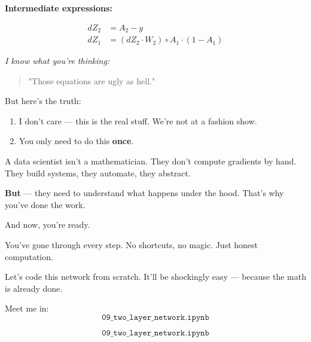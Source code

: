 \documentclass[11pt]{article}
\begin{document}
\vspace{1em}

\textbf{Intermediate expressions:}

\[
\boxed{
\begin{aligned}
dZ_2 &= A_2 - y \\
dZ_1 &= (dZ_2 \cdot W_2) \circ A_1 \cdot (1 - A_1)
\end{aligned}
}
\]

\vspace{2em}

\textit{I know what you're thinking:}

\begin{quote}
"Those equations are ugly as hell."
\end{quote}

But here’s the truth:

\begin{enumerate}
  \item I don't care — this is the real stuff. We’re not at a fashion show.
  \item You only need to do this \textbf{once}.
\end{enumerate}

\vspace{1em}

A data scientist isn’t a mathematician.  
They don’t compute gradients by hand.  
They build systems, they automate, they abstract.

\textbf{But} — they need to understand what happens under the hood.  
That’s why you’ve done the work.

\vspace{1em}

And now, you’re ready.

You’ve gone through every step. No shortcuts, no magic. Just honest computation.

\vspace{1em}

\begin{tcolorbox}[colback=blue!5!white, colframe=blue!80!black, title=Next Stop — Practice]
Let’s code this network from scratch.  
It’ll be shockingly easy — because the math is already done.

Meet me in:  
\[
\texttt{09\_two\_layer\_network.ipynb}
\]
\end{tcolorbox}


\newpage

\label{sec:practice_02}
\[
\texttt{09\_two\_layer\_network.ipynb}
\]
\end{document}
